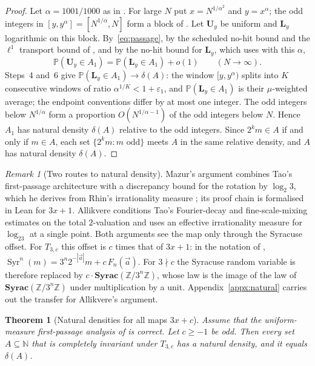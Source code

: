 \documentclass[12pt]{amsart}
\newtheorem{theorem}{Theorem}
\theoremstyle{definition}
\theoremstyle{remark}
\newtheorem{remark}{Remark}
\newcommand{\N}{\mathbb{N}}
\begin{document}
\begin{proof}
Let $\alpha=1001/1000$ as in \cite{Mazur_2026}. For large $N$ put $x=N^{1/\alpha^2}$ and $y=x^\alpha$; the odd integers in $[y,y^\alpha]=[N^{1/\alpha},N]$ form a block of \cite[Theorem~3.1]{Mazur_2026}. Let $\mathbf U_y$ be uniform and $\mathbf L_y$ logarithmic on this block. By~\eqref{eq:passage}, by the scheduled no-hit bound and the $\ell^1$ transport bound of \cite[Theorem~3.1]{Mazur_2026}, and by the no-hit bound \cite[(1.19)]{Tao_2022} for $\mathbf L_y$, which \cite{Mazur_2026} uses with this $\alpha$,
\[
\mathbb P(\mathbf U_y\in A_1)=\mathbb P(\mathbf L_y\in A_1)+o(1)\qquad(N\to\infty).
\]
Steps~4 and~6 give $\mathbb P(\mathbf L_y\in A_1)\to\delta(A)$: the window $[y,y^\alpha)$ splits into $K$ consecutive windows of ratio $\alpha^{1/K}<1+\varepsilon_1$, and $\mathbb P(\mathbf L_y\in A_1)$ is their $\mu$-weighted average; the endpoint conventions differ by at most one integer. The odd integers below $N^{1/\alpha}$ form a proportion $O(N^{1/\alpha-1})$ of the odd integers below $N$. Hence $A_1$ has natural density $\delta(A)$ relative to the odd integers. Since $2^km\in A$ if and only if $m\in A$, each set $\{2^km:m\text{ odd}\}$ meets $A$ in the same relative density, and $A$ has natural density $\delta(A)$.
\end{proof}

\begin{remark}[Two routes to natural density]
\label{rem:mazur}
Mazur's argument combines Tao's first-passage architecture with a discrepancy bound for the rotation by $\log_2 3$, which he derives from Rhin's irrationality measure \cite{Mazur_2026}; its proof chain is formalised in Lean for $3x+1$. Allikvere \cite{Allikvere_2026} conditions Tao's Fourier-decay and fine-scale-mixing estimates on the total $2$-valuation and uses an effective irrationality measure for $\log_23$ at a single point. Both arguments see the map only through the Syracuse offset. For $T_{3,c}$ this offset is $c$ times that of $3x+1$: in the notation of \cite{Tao_2022}, $\operatorname{Syr}^n(m)=3^n2^{-|\vec a|}m+c\,F_n(\vec a)$. For $3\nmid c$ the Syracuse random variable is therefore replaced by $c\cdot\mathbf{Syrac}(\mathbb Z/3^n\mathbb Z)$, whose law is the image of the law of $\mathbf{Syrac}(\mathbb Z/3^n\mathbb Z)$ under multiplication by a unit. Appendix~\ref{appx:natural} carries out the transfer for Allikvere's argument.
\end{remark}

\begin{theorem}[Natural densities for all maps $3x+c$]
\label{thm:natural}
Assume that the uniform-measure first-passage analysis of \cite[Section~6]{Allikvere_2026} is correct. Let $c\ge-1$ be odd. Then every set $A\subseteq\N$ that is completely invariant under $T_{3,c}$ has a natural density, and it equals $\delta(A)$.
\end{theorem}
\end{document}
